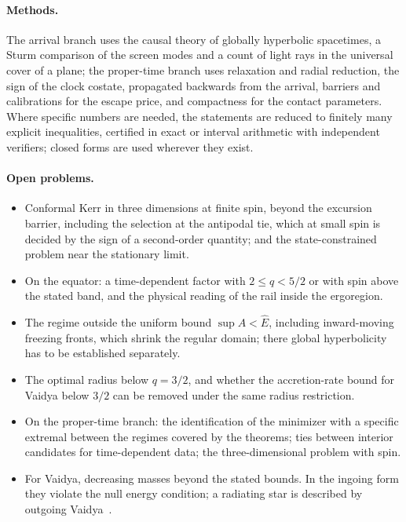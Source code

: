 \documentclass[aip,jmp,amsmath,amssymb,reprint]{revtex4-2}
\newcommand{\Ehat}{\hat E}
\theoremstyle{plain}
\theoremstyle{definition}
\begin{document}
\paragraph{Methods.} The arrival branch uses the causal theory of globally hyperbolic spacetimes, a Sturm
comparison of the screen modes and a count of light rays in the universal cover of a plane; the
proper-time branch uses relaxation and radial reduction, the sign of the clock costate, propagated
backwards from the arrival, barriers and calibrations for the escape price, and compactness for the contact parameters.
Where specific numbers are needed, the statements are reduced to finitely many explicit inequalities,
certified in exact or interval arithmetic with independent verifiers; closed forms are used wherever
they exist.

\paragraph{Open problems.}
\begin{itemize}
\item Conformal Kerr in three dimensions at finite spin, beyond the excursion barrier, including the
  selection at the antipodal tie, which at small spin is decided by the sign of a second-order
  quantity; and the state-constrained problem near the stationary limit.
\item On the equator: a time-dependent factor with $2\le q<5/2$ or with spin above the stated band, and
  the physical reading of the rail inside the ergoregion.
\item The regime outside the uniform bound $\sup A<\Ehat$, including inward-moving freezing fronts, which shrink the
  regular domain; there global hyperbolicity has to be established separately.
\item The optimal radius below $q=3/2$, and whether the accretion-rate bound for Vaidya below $3/2$ can be
  removed under the same radius restriction.
\item On the proper-time branch: the identification of the minimizer with a specific extremal between
  the regimes covered by the theorems; ties between interior candidates for time-dependent data; the
  three-dimensional problem with spin.
\item For Vaidya, decreasing masses beyond the stated bounds. In the ingoing form they violate the null
  energy condition; a radiating star is described by outgoing Vaidya~\cite{Vaidya1951,LindquistSchwartzMisner1965}.
\end{itemize}
\end{document}
